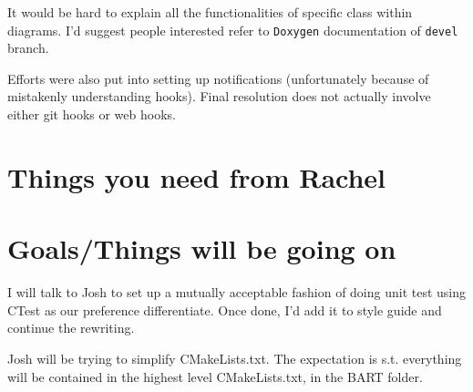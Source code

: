 \documentclass{article}
\begin{document}
It would be hard to explain all the functionalities of specific class within diagrams. I'd suggest people interested refer to {\tt Doxygen} documentation of {\tt devel} branch.

Efforts were also put into setting up notifications (unfortunately because of mistakenly understanding hooks). Final resolution does not actually involve either git hooks or web hooks. 
\section{Things you need from Rachel}


\section{Goals/Things will be going on}
I will talk to Josh to set up a mutually acceptable fashion of doing unit test using CTest as 
our preference differentiate. Once done, I'd add it to style guide and continue the rewriting.

Josh will be trying to simplify CMakeLists.txt. The expectation is s.t. everything will be contained 
in the highest level CMakeLists.txt, in the BART folder.





%
%
%

\end{document}
